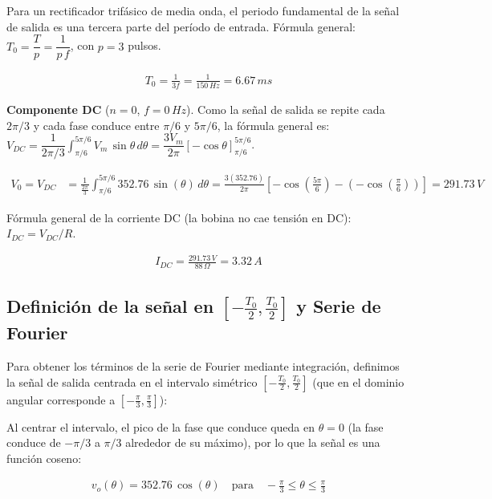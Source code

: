 \documentclass[11pt]{article}
\begin{document}
Para un rectificador trif\'asico de media onda, el periodo fundamental de la
se\~nal de salida es una tercera parte del per\'iodo de entrada. F\'ormula
general: $T_0 = \dfrac{T}{p} = \dfrac{1}{p\,f}$, con $p=3$ pulsos.

\begin{align*}
T_0 = \frac{1}{3f} = \frac{1}{150\,Hz} = \boxed{6.67\,ms}
\end{align*}

\textbf{Componente DC} ($n=0$, $f=0\,Hz$). Como la se\~nal de salida se repite
cada $2\pi/3$ y cada fase conduce entre $\pi/6$ y $5\pi/6$, la f\'ormula
general es:
$V_{DC} = \dfrac{1}{2\pi/3}\displaystyle\int_{\pi/6}^{5\pi/6} V_m\,\sin\theta\,d\theta
= \dfrac{3V_m}{2\pi}\left[-\cos\theta\right]_{\pi/6}^{5\pi/6}$.

\begin{align*}
V_0 = V_{DC} &= \frac{1}{\frac{2\pi}{3}}\int_{\pi/6}^{5\pi/6} 352.76\,\sin(\theta)\,d\theta
= \frac{3(352.76)}{2\pi}\left[-\cos\!\left(\frac{5\pi}{6}\right)-\left(-\cos\!\left(\frac{\pi}{6}\right)\right)\right]
= \boxed{291.73\,V}
\end{align*}

F\'ormula general de la corriente DC (la bobina no cae tensi\'on en DC):
$I_{DC} = V_{DC}/R$.

\begin{align*}
I_{DC} = \frac{291.73\,V}{88\,\Omega} = \boxed{3.32\,A}
\end{align*}

\subsection{Definici\'on de la se\~nal en $\left[-\frac{T_0}{2},\frac{T_0}{2}\right]$ y Serie de Fourier}

Para obtener los t\'erminos de la serie de Fourier mediante integraci\'on,
definimos la se\~nal de salida centrada en el intervalo sim\'etrico
$\left[-\frac{T_0}{2},\frac{T_0}{2}\right]$ (que en el dominio angular
corresponde a $\left[-\frac{\pi}{3},\frac{\pi}{3}\right]$):

Al centrar el intervalo, el pico de la fase que conduce queda en $\theta=0$
(la fase conduce de $-\pi/3$ a $\pi/3$ alrededor de su m\'aximo), por lo que la
se\~nal es una funci\'on coseno:

\begin{align*}
v_o(\theta) = 352.76\,\cos(\theta) \quad \text{para} \quad -\frac{\pi}{3}\le\theta\le\frac{\pi}{3}
\end{align*}
\end{document}
